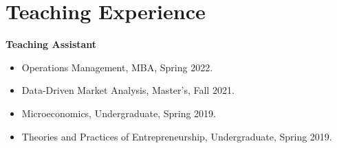 \section*{Teaching Experience}

\textbf{Teaching Assistant}
\begin{itemize}[leftmargin=1.2em]
  \cvitemsep
  \item Operations Management, MBA, Spring 2022.
  \item Data-Driven Market Analysis, Master's, Fall 2021.
  \item Microeconomics, Undergraduate, Spring 2019.
  \item Theories and Practices of Entrepreneurship, Undergraduate, Spring 2019.
\end{itemize}

